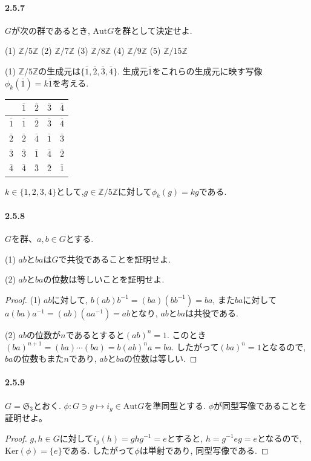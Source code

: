 \paragraph{2.5.7} $G$が次の群であるとき, $\mathrm{Aut}G$を群として決定せよ.

(1) $\mathbb{Z}/5\mathbb{Z}$ \quad (2) $\mathbb{Z}/7\mathbb{Z}$ \quad
(3) $\mathbb{Z}/8\mathbb{Z}$ \quad (4) $\mathbb{Z}/9\mathbb{Z}$ \quad
(5) $\mathbb{Z}/15\mathbb{Z}$ 

(1) $\mathbb{Z}/5\mathbb{Z}$の生成元は$\{\bar{1},\bar{2},\bar{3},\bar{4}\}$.
生成元$\bar{1}$をこれらの生成元に映す写像$\phi_k(\bar{1})=k\bar{1}$を考える.
\begin{tabular}{c|cccc}
             & $\bar{1}$ & $\bar{2}$ & $\bar{3}$ & $\bar{4}$ \\ \hline
   $\bar{1}$ & $\bar{1}$ & $\bar{2}$ & $\bar{3}$ & $\bar{4}$ \\
   $\bar{2}$ & $\bar{2}$ & $\bar{4}$ & $\bar{1}$ & $\bar{3}$ \\
   $\bar{3}$ & $\bar{3}$ & $\bar{1}$ & $\bar{4}$ & $\bar{2}$ \\
   $\bar{4}$ & $\bar{4}$ & $\bar{3}$ & $\bar{2}$ & $\bar{1}$ 
\end{tabular}

$k\in \{1,2,3,4\}$として,$g\in \mathbb{Z}/5\mathbb{Z}$に対して$\phi_k(g)=kg$である.
\newline

\paragraph{2.5.8} $G$を群、$a,b \in G$とする.

(1) $ab$と$ba$は$G$で共役であることを証明せよ.

(2) $ab$と$ba$の位数は等しいことを証明せよ.
\begin{proof}
  (1) $ab$に対して, $b(ab)b^{-1}=(ba)(bb^{-1})=ba$, また$ba$に対して$a(ba)a^{-1}=(ab)(aa^{-1})=ab$となり, $ab$と$ba$は共役である.
  
  (2) $ab$の位数が$n$であるとすると$(ab)^n=1$. 
  このとき$(ba)^{n+1}=(ba)\cdots(ba)=b(ab)^na=ba$.
  したがって$(ba)^n=1$となるので, $ba$の位数もまた$n$であり, $ab$と$ba$の位数は等しい.
\end{proof}\leavevmode

\paragraph{2.5.9} $G=\mathfrak{S}_3$とおく. 
$\phi:G\ni g\mapsto i_g \in \mathrm{Aut}G$を準同型とする.
$\phi$が同型写像であることを証明せよ。
\begin{proof}
  $g,h \in G$に対して$i_g (h)=ghg^{-1}=e$とすると,
  $h=g^{-1}eg=e$となるので, $\mathrm{Ker}(\phi)=\{e\}$である.
  したがって$\phi$は単射であり, 同型写像である.  
\end{proof}\leavevmode

